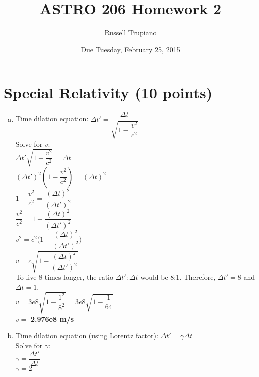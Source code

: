 \documentclass{article}
\title {ASTRO 206 Homework 2}
\author{Russell Trupiano}
\begin{document}
\date{Due Tuesday, February 25, 2015}

\maketitlepoop

\section {Special Relativity (10 points)}
    \begin{adjustwidth}{.6cm}{}
        \begin{enumerate}[a)]
            \item
            Time dilation equation: $\Delta{t'} = \dfrac{\Delta{t}}{\sqrt{1-\dfrac{v^2}{c^2}}}$\\
            Solve for $v$:\\

            $\Delta{t'}\sqrt{1-\dfrac{v^2}{c^2}} = \Delta{t}$\\

            $(\Delta{t'})^2(1-\dfrac{v^2}{c^2}) = (\Delta{t})^2$\\

            $1-\dfrac{v^2}{c^2} = \dfrac{(\Delta{t})^2}{(\Delta{t'})^2}$\\

            $\dfrac{v^2}{c^2} = 1-\dfrac{(\Delta{t})^2}{(\Delta{t'})^2}$\\

            $v^2 = c^2\Bigg(1-\dfrac{(\Delta{t})^2}{(\Delta{t'})^2}\Bigg)$\\

            $v = c\sqrt{1-\dfrac{(\Delta{t})^2}{(\Delta{t'})^2}}$\\

            To live 8 times longer, the ratio $\Delta{t'}:\Delta{t}$ would be 8:1. Therefore, $\Delta{t'} = 8$ and $\Delta{t} = 1$.\\

            $v = 3e8\sqrt{1-\dfrac{1^2}{8^2}} = 3e8\sqrt{1-\dfrac{1}{64}}$\\

            $v = $ \textbf{2.976e8 m/s}

            \item
            Time dilation equation (using Lorentz factor): $\Delta{t'} = \gamma\Delta{t}$\\
            Solve for $\gamma$:\\

            $\gamma = \dfrac{\Delta{t'}}{\Delta{t}}$\\

            $\gamma = 2$\\


\end{enumerate}
\end{adjustwidth}
\end{document}
